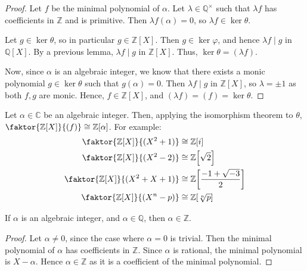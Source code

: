 \begin{proof}
	Let \( f \) be the minimal polynomial of \( \alpha \).
	Let \( \lambda \in \mathbb Q^\times \) such that \( \lambda f \) has coefficients in \( \mathbb Z \) and is primitive.
	Then \( \lambda f(\alpha) = 0 \), so \( \lambda f \in \ker \theta \).

	Let \( g \in \ker \theta \), so in particular \( g \in \mathbb Z[X] \).
	Then \( g \in \ker \varphi \), and hence \( \lambda f \mid g \) in \( \mathbb Q[X] \).
	By a previous lemma, \( \lambda f \mid g \) in \( \mathbb Z[X] \).
	Thus, \( \ker \theta = (\lambda f) \).

	Now, since \( \alpha \) is an algebraic integer, we know that there exists a monic polynomial \( g \in \ker \theta \) such that \( g(\alpha) = 0 \).
	Then \( \lambda f \mid g \) in \( \mathbb Z[X] \), so \( \lambda = \pm 1 \) as both \( f, g \) are monic.
	Hence, \( f \in \mathbb Z[X] \), and \( (\lambda f) = (f) = \ker \theta \).
\end{proof}
Let \( \alpha \in \mathbb C \) be an algebraic integer.
Then, applying the isomorphism theorem to \( \theta \), \( \faktor{\mathbb Z[X]}{(f)} \cong \mathbb Z[\alpha] \).
For example:
\begin{align*}
    \faktor{\mathbb Z[X]}{(X^2 + 1)} &\cong \mathbb Z[i] \\
    \faktor{\mathbb Z[X]}{(X^2 - 2)} &\cong \mathbb Z\qty[\sqrt{2}] \\
    \faktor{\mathbb Z[X]}{(X^2 + X + 1)} &\cong \mathbb Z\qty[\frac{-1+\sqrt{-3}}{2}] \\
    \faktor{\mathbb Z[X]}{(X^n - p)} &\cong \mathbb Z\qty[\sqrt[n]{p}]
\end{align*}
\begin{corollary}
	If \( \alpha \) is an algebraic integer, and \( \alpha \in \mathbb Q \), then \( \alpha \in \mathbb Z \).
\end{corollary}
\begin{proof}
	Let \( \alpha \neq 0 \), since the case where \( \alpha = 0 \) is trivial.
	Then the minimal polynomial of \( \alpha \) has coefficients in \( \mathbb Z \).
	Since \( \alpha \) is rational, the minimal polynomial is \( X - \alpha \).
	Hence \( \alpha \in \mathbb Z \) as it is a coefficient of the minimal polynomial.
\end{proof}
